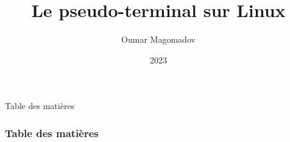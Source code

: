 \documentclass{beamer}
\title{Le pseudo-terminal sur Linux}
\author{Oumar Magomadov}
\institute{École Supérieure d'Informatique}
\date{2023}
\begin{document}
\frame{\titlepage}

\begin{frame}{Table des matières}
	\frametitle{Table des matières}
	\tableofcontents
\end{frame}





\end{document}
